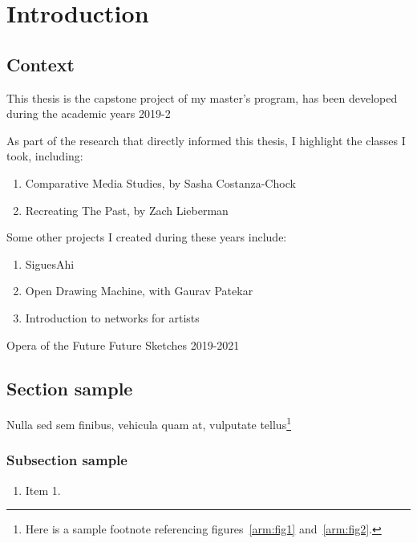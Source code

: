 \chapter{Introduction}

\section{Context}

This thesis is the capstone project of my master's program, has been developed during the academic years 2019-2

As part of the research that directly informed this thesis, I highlight the classes I took,
including:

\begin{enumerate}
        \item Comparative Media Studies, by Sasha Costanza-Chock
        \item Recreating The Past, by Zach Lieberman
\end{enumerate}

Some other projects I created during these years include:

\begin{enumerate}
        \item SiguesAhi
        \item Open Drawing Machine, with Gaurav Patekar
        \item Introduction to networks for artists
\end{enumerate}

\cite[John Maeda, 2001]{design-by-numbers}

Opera of the Future
Future Sketches
2019-2021

\section{Section sample}\label{ch1:sec}

Nulla sed sem finibus, vehicula quam at, vulputate tellus\footnote{Here is a sample footnote referencing figures~\ref{arm:fig1}
and~\ref{arm:fig2}.}  

\subsection{Subsection sample}

\begin{enumerate}
  \item Item 1.
\end{enumerate}
